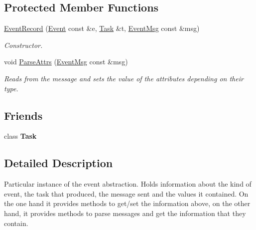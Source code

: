 \subsection*{Protected Member Functions}
\begin{DoxyCompactItemize}
\item 
\hyperlink{class_model_1_1_event_record_aeec12aa3a0cf5340e24a6e831ad9b938}{Event\-Record} (\hyperlink{class_model_1_1_event}{Event} const \&e, \hyperlink{class_model_1_1_task}{Task} \&t, \hyperlink{class_common_1_1_event_msg}{Event\-Msg} const \&msg)
\begin{DoxyCompactList}\small\item\em Constructor. \end{DoxyCompactList}\item 
void \hyperlink{class_model_1_1_event_record_a52f2fc868d5900f7d3750c99c1363afc}{Parse\-Attrs} (\hyperlink{class_common_1_1_event_msg}{Event\-Msg} const \&msg)
\begin{DoxyCompactList}\small\item\em Reads from the message and sets the value of the attributes depending on their type. \end{DoxyCompactList}\end{DoxyCompactItemize}
\subsection*{Friends}
\begin{DoxyCompactItemize}
\item 
\hypertarget{class_model_1_1_event_record_aaa7728226b6ce66782e8816b1658dd9a}{class {\bfseries Task}}\label{class_model_1_1_event_record_aaa7728226b6ce66782e8816b1658dd9a}

\end{DoxyCompactItemize}


\subsection{Detailed Description}
Particular instance of the event abstraction. Holds information about the kind of event, the task that produced, the message sent and the values it contained. On the one hand it provides methods to get/set the information above, on the other hand, it provides methods to parse messages and get the information that they contain. 

